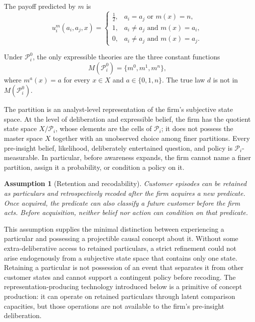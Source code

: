 \documentclass[11pt]{article}
\newtheorem{assumption}{Assumption}[section]
\begin{document}
The payoff predicted by $m$ is
\begin{equation}
u_i^m(a_i,a_j,x)=
\begin{cases}
\frac12, & a_i=a_j\text{ or }m(x)=n,\\
1, & a_i\neq a_j\text{ and }m(x)=a_i,\\
0, & a_i\neq a_j\text{ and }m(x)=a_j.
\end{cases}
\label{eq:subjective-payoff}
\end{equation}

Under $\mathcal P_i^0$, the only expressible theories are the three constant
functions
\[
M(\mathcal P_i^0)=\{m^0,m^1,m^n\},
\]
where $m^a(x)=a$ for every $x\in X$ and $a\in\{0,1,n\}$.  The true law $d$ is
not in $M(\mathcal P_i^0)$.

The partition is an analyst-level representation of the firm's subjective
state space.  At the level of deliberation and expressible belief, the firm has
the quotient state space $X/\mathcal P_i$, whose elements are the cells of
$\mathcal P_i$; it does not possess the master space $X$ together with an
unobserved choice among finer partitions.  Every pre-insight belief,
likelihood, deliberately entertained question, and policy is
$\mathcal P_i$-measurable.  In particular, before awareness expands, the firm
cannot name a finer partition, assign it a probability, or condition a policy
on it.

\begin{assumption}[Retention and recodability]
\label{ass:recodability}
Customer episodes can be retained as particulars and retrospectively recoded
after the firm acquires a new predicate.  Once acquired, the predicate can also
classify a future customer before the firm acts.  Before acquisition, neither
belief nor action can condition on that predicate.
\end{assumption}

This assumption supplies the minimal distinction between experiencing a
particular and possessing a projectible causal concept about it.  Without some
extra-deliberative access to retained particulars, a strict refinement could
not arise endogenously from a subjective state space that contains only one
state.  Retaining a particular is not possession of an event that separates it
from other customer states and cannot support a contingent policy before
recoding.  The representation-producing technology introduced below is a
primitive of concept production: it can operate on retained particulars through
latent comparison capacities, but those operations are not available to the
firm's pre-insight deliberation.
\end{document}
